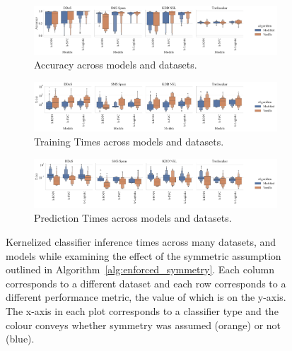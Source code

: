 \documentclass[conference]{IEEEtran}
\begin{document}
\begin{figure}[htb]
    \centering
    \begin{subfigure}[htb]{\textwidth}
        \includegraphics[width=\textwidth]{figs/combined/modified_models_vs_accuracy.pdf}
        \caption{Accuracy across models and datasets.}
        \label{fig:mod_acc}
    \end{subfigure}
    \begin{subfigure}[htb]{\textwidth}
        \centering
        \includegraphics[width=\textwidth]{figs/combined/modified_models_vs_train_time.pdf}
        \caption{Training Times across models and datasets.}
        \label{fig:mod_train_time}
    \end{subfigure}
    \begin{subfigure}[htb]{\textwidth}
        \includegraphics[width=\textwidth]{figs/combined/modified_models_vs_predict_time.pdf}
        \caption{Prediction Times across models and datasets.}
        \label{fig:mod_pred_time}
    \end{subfigure}
    \caption{Kernelized classifier inference times across many datasets, and models while examining the effect of the symmetric assumption outlined in Algorithm~\ref{alg:enforced_symmetry}. Each column corresponds to a different dataset and each row corresponds to a different performance metric, the value of which is on the y-axis. The x-axis in each plot corresponds to a classifier type and the colour conveys whether symmetry was assumed (orange) or not (blue).}
    \label{fig:mod_summary}
\end{figure}
\end{document}
